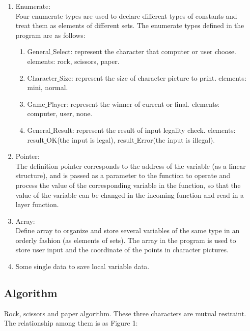 \documentclass[12pt]{article}
\begin{document}
	\begin{enumerate}
		\item Enumerate:\\
		Four enumerate types are used to declare different types of constants and treat them as elements of different sets. The enumerate types defined in the program are as follows:
		
		\begin{enumerate}[$\bullet$]
			\item General$\_$Select: represent the character that computer or user choose.
			elements: rock, scissors, paper.
			\item Character$\_$Size: represent the size of character picture to print.
			elements: mini, normal.
			\item Game$\_$Player: represent the winner of current or final.
			elements: computer, user, none.
			\item General$\_$Result: represent the result of input legality check.
			elements: result$\_$OK(the input is legal), result$\_$Error(the input is illegal).
		\end{enumerate}
		
		\item Pointer:\\
		The definition pointer corresponds to the address of the variable (as a linear structure), and is passed as a parameter to the function to operate and process the value of the corresponding variable in the function, so that the value of the variable can be changed in the incoming function and read in a layer function.
		
		\item Array:\\
		Define array to organize and store several variables of the same type in an orderly fashion (as elements of sets). The array in the program is used to store user input and the coordinate of the points in character pictures.
		
		\item Some single data to save local variable data.
	\end{enumerate}

	\subsection{Algorithm}
	
	Rock, scissors and paper algorithm. These three characters are mutual restraint. The relationship among them is as Figure 1:
	
\end{document}
